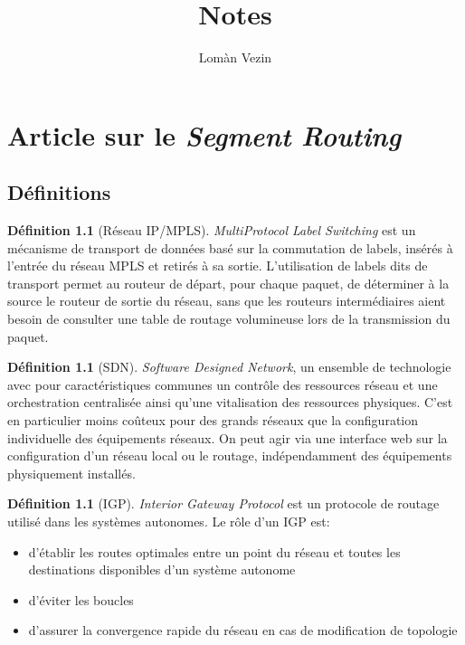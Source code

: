 \documentclass[12pt]{book}
\title{Notes}
\author{Lomàn Vezin}
\theoremstyle{definition}
\newtheorem{definition}[lemma]{Définition}
\theoremstyle{remark}
\begin{document}
       \maketitle 

       \chapter{Article sur le \emph{Segment Routing}}
       \section{Définitions}

       \begin{definition}[Réseau IP/MPLS]
        \emph{MultiProtocol Label Switching} est un mécanisme de transport de données basé sur la commutation de labels, insérés à l'entrée du réseau MPLS et retirés à sa sortie. 
        L'utilisation de labels dits de transport permet au routeur de départ, pour chaque paquet, de déterminer à la source le routeur de sortie du réseau, sans que les routeurs intermédiaires aient besoin de consulter une table de routage volumineuse lors de la transmission du paquet.
       \end{definition}

       \begin{definition}[SDN]
               \emph{Software Designed Network}, un ensemble de technologie avec pour caractéristiques communes un contrôle des ressources réseau et une orchestration centralisée ainsi qu'une vitalisation des ressources physiques. C'est en particulier moins coûteux pour des grands réseaux que la configuration individuelle des équipements réseaux. On peut agir via une interface web sur la configuration d'un réseau local ou le routage, indépendamment des équipements physiquement installés.
       \end{definition}

       \begin{definition}[IGP]
               \emph{Interior Gateway Protocol} est un protocole de routage utilisé dans les systèmes autonomes. Le rôle d'un IGP est:
               \begin{itemize}
                       \item d'établir les routes optimales entre un point du réseau et toutes les destinations disponibles d'un système autonome
                       \item d'éviter les boucles
                       \item d'assurer la convergence rapide du réseau en cas de modification de topologie
               \end{itemize}
       \end{definition}
\end{document}
